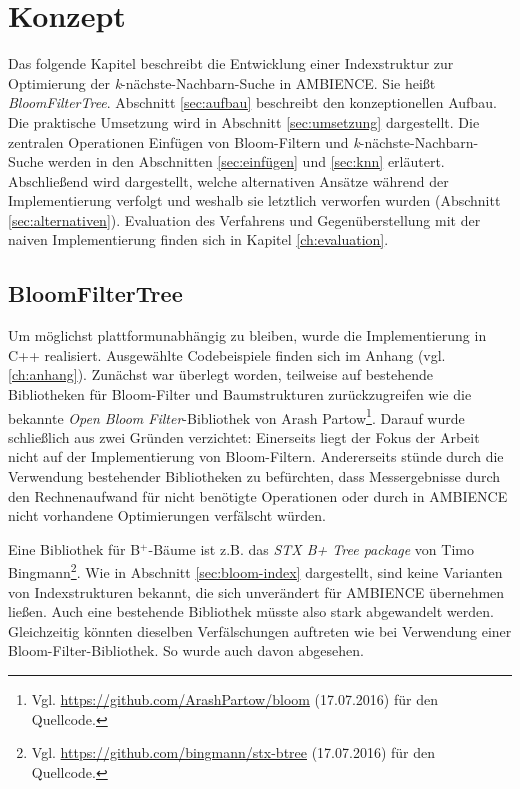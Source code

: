 \chapter{Konzept}\label{ch:implementierung}
Das folgende Kapitel beschreibt die Entwicklung einer Indexstruktur zur Optimierung der \textit{k}-nächste-Nachbarn-Suche in AMBIENCE. Sie heißt \textit{BloomFilterTree}. Abschnitt \ref{sec:aufbau} beschreibt den konzeptionellen Aufbau. Die praktische Umsetzung wird in Abschnitt \ref{sec:umsetzung} dargestellt. Die zentralen Operationen Einfügen von Bloom-Filtern und \textit{k}-nächste-Nachbarn-Suche werden in den Abschnitten \ref{sec:einfügen} und \ref{sec:knn} erläutert. Abschließend wird dargestellt, welche alternativen Ansätze während der Implementierung verfolgt und weshalb sie letztlich verworfen wurden (Abschnitt \ref{sec:alternativen}). Evaluation des Verfahrens und Gegenüberstellung mit der naiven Implementierung finden sich in Kapitel \ref{ch:evaluation}.  
\section{BloomFilterTree}\label{sec:bloom-filter-tree}
Um möglichst plattformunabhängig zu bleiben, wurde die Implementierung in C++ realisiert. Ausgewählte Codebeispiele finden sich im Anhang (vgl. \ref{ch:anhang}). Zunächst war überlegt worden, teilweise auf bestehende Bibliotheken für Bloom-Filter und Baumstrukturen zurückzugreifen wie die bekannte \textit{Open Bloom Filter}-Bibliothek von Arash Partow\footnote{Vgl. \url{https://github.com/ArashPartow/bloom} (17.07.2016) für den Quellcode.}. Darauf wurde schließlich aus zwei Gründen verzichtet: Einerseits liegt der Fokus der Arbeit nicht auf der Implementierung von Bloom-Filtern. Andererseits stünde durch die Verwendung bestehender Bibliotheken zu befürchten, dass Messergebnisse durch den Rechnenaufwand für nicht benötigte Operationen oder durch in AMBIENCE nicht vorhandene Optimierungen verfälscht würden. 

Eine Bibliothek für B$^+$-Bäume ist z.B. das \textit{STX B+ Tree package} von Timo Bingmann\footnote{Vgl. \url{https://github.com/bingmann/stx-btree} (17.07.2016) für den Quellcode.}. Wie in Abschnitt \ref{sec:bloom-index} dargestellt, sind keine Varianten von Indexstrukturen bekannt, die sich unverändert für AMBIENCE übernehmen ließen. Auch eine bestehende Bibliothek müsste also stark abgewandelt werden. Gleichzeitig könnten dieselben Verfälschungen auftreten wie bei Verwendung einer Bloom-Filter-Bibliothek. So wurde auch davon abgesehen.
